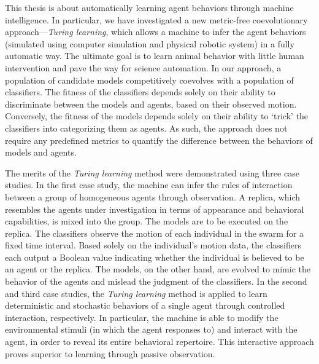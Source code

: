 This thesis is about automatically learning agent behaviors through machine intelligence. In particular, we have investigated a new metric-free coevolutionary approach---\textit{Turing learning}, which allows a machine to infer the agent behaviors (simulated using computer simulation and physical robotic system) in a fully automatic way. The ultimate goal is to learn animal behavior with little human intervention and pave the way for science automation. In our approach, a population of candidate models competitively coevolves with a population of classifiers. The fitness of the classifiers depends solely on their ability to discriminate between the models and agents, based on their observed motion. Conversely, the fitness of the models depends solely on their ability to ‘trick’ the classifiers into categorizing them as agents. As such, the approach does not require any predefined metrics to quantify the difference between the behaviors of models and agents.

The merits of the \textit{Turing learning} method were demonstrated using three case studies. In the first case study, the machine can infer the rules of interaction between a group of homogeneous agents through observation. A replica, which resembles the agents under investigation in terms of appearance and behavioral capabilities, is mixed into the group. The models are to be executed on the replica. The classifiers observe the motion of each individual in the swarm for a fixed time interval. Based solely on the individual's motion data, the classifiers each output a Boolean value indicating whether the individual is believed to be an agent or the replica. The models, on the other hand, are evolved to mimic the behavior of the agents and mislead the judgment of the classifiers. In the second and third case studies, the \textit{Turing learning} method is applied to learn deterministic and stochastic behaviors of a single agent through controlled interaction, respectively. In particular, the machine is able to modify the environmental stimuli (in which the agent responses to) and interact with the agent, in order to reveal its entire behavioral repertoire. This interactive approach proves superior to learning through passive observation. 
